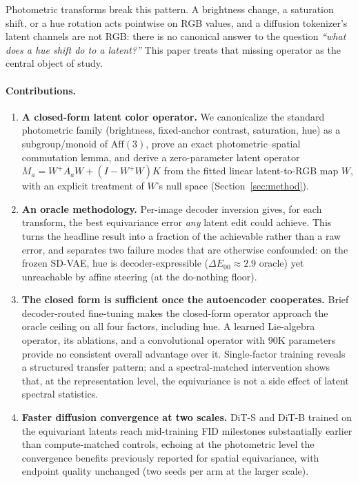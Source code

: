 \documentclass[11pt]{article}
\newcommand{\de}{\Delta E_{00}}
\newcommand{\Wp}{W^{+}}
\begin{document}
Photometric transforms break this pattern. A brightness change, a saturation
shift, or a hue rotation acts pointwise on RGB values, and a diffusion
tokenizer's latent channels are not RGB: there is no canonical answer to the
question \emph{``what does a hue shift do to a latent?''} This paper treats
that missing operator as the central object of study.

\paragraph{Contributions.}
\begin{enumerate}
  \item \textbf{A closed-form latent color operator.} We canonicalize the
  standard photometric family (brightness, fixed-anchor contrast, saturation,
  hue) as a subgroup/monoid of $\mathrm{Aff}(3)$, prove an exact
  photometric--spatial commutation lemma, and derive a zero-parameter latent
  operator $M_a = \Wp A_a W + (I - \Wp W)K$ from the fitted linear
  latent-to-RGB map $W$, with an explicit treatment of $W$'s null space
  (Section~\ref{sec:method}).
  \item \textbf{An oracle methodology.} Per-image decoder inversion gives, for
  each transform, the best equivariance error \emph{any} latent edit could
  achieve. This turns the headline result into a fraction of the achievable
  rather than a raw error, and separates two failure modes that are otherwise
  confounded: on the frozen SD-VAE, hue is decoder-expressible
  ($\de \approx 2.9$ oracle) yet unreachable by affine steering
  (at the do-nothing floor).
  \item \textbf{The closed form is sufficient once the autoencoder
  cooperates.} Brief decoder-routed fine-tuning makes the closed-form operator
  approach the oracle ceiling on all four factors, including hue. A learned
  Lie-algebra operator, its ablations, and a convolutional operator with
  $90$K parameters provide no consistent overall advantage over it. Single-factor training
  reveals a structured transfer pattern; and a spectral-matched intervention
  shows that, at the representation level, the equivariance is not a side
  effect of latent spectral statistics.
  \item \textbf{Faster diffusion convergence at two scales.} DiT-S and DiT-B
  trained on the equivariant latents reach mid-training FID milestones
  substantially earlier than compute-matched controls, echoing at the
  photometric level the convergence benefits previously reported for spatial
  equivariance, with endpoint quality unchanged (two seeds per arm at the
  larger scale).
\end{enumerate}
\end{document}
